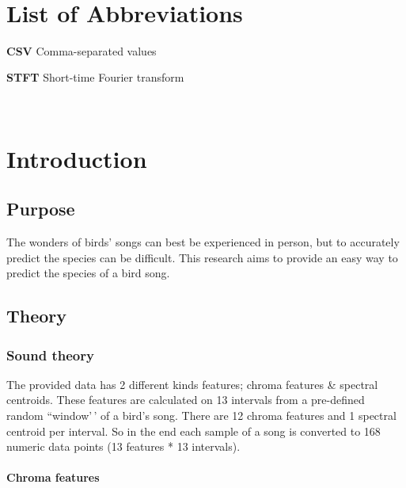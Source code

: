 \documentclass[
]{article}
\begin{document}
\label{sec:summ}~
\newpage

\section*{List of Abbreviations}

\textbf{CSV} Comma-separated values

\textbf{STFT} Short-time Fourier transform

\label{sec:abvs}~

\newpage

{
\setcounter{tocdepth}{2}
\tableofcontents
}
\newpage


\hypertarget{introduction}{%
\section{Introduction}\label{introduction}}

\hypertarget{purpose}{%
\subsection{Purpose}\label{purpose}}

The wonders of birds' songs can best be experienced in person, but to
accurately predict the species can be difficult. This research aims to
provide an easy way to predict the species of a bird song.

\hypertarget{theory}{%
\subsection{Theory}\label{theory}}

\hypertarget{sound-theory}{%
\subsubsection{Sound theory}\label{sound-theory}}

The provided data has 2 different kinds features; chroma features \&
spectral centroids. These features are calculated on 13 intervals from a
pre-defined random ``window'\,' of a bird's song. There are 12 chroma
features and 1 spectral centroid per interval. So in the end each sample
of a song is converted to 168 numeric data points (13 features * 13
intervals).

\hypertarget{chroma-features}{%
\paragraph{Chroma features}\label{chroma-features}}
\end{document}
